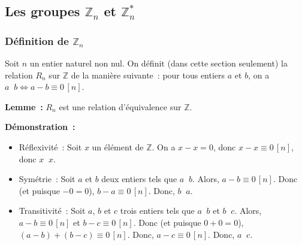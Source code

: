 \subsection{Les groupes \texorpdfstring{$\mathbb{Z}_n$}{Zn} et \texorpdfstring{$\mathbb{Z}_n^*$}{Zn*}}

\subsubsection{Définition de \texorpdfstring{$\mathbb{Z}_n$}{Zn}}
\label{sub:def_Z_nZ}

Soit $n$ un entier naturel non nul. 
On définit (dans cette section seulement) la relation $R_n$ sur $\mathbb{Z}$ de la manière suivante : pour tous entiers $a$ et $b$, on a $a \mathop{R_n} b \Leftrightarrow a - b \equiv 0 \, [n]$.

\medskip

\noindent\textbf{Lemme :} $R_n$ est une relation d'équivalence sur $\mathbb{Z}$. 

\medskip

\noindent\textbf{Démonstration :} 
\begin{itemize}[nosep]
    \item Réflexivité : Soit $x$ un élément de $\mathbb{Z}$. 
        On a $x - x = 0$, donc $x - x \equiv 0 \, [n]$, donc $x \mathop{R_n} x$.
    \item Symétrie : Soit $a$ et $b$ deux entiers tels que $a \mathop{R_n} b$.
        Alors, $a - b \equiv 0 \, [n]$.
        Donc (et puisque $-0 = 0$), $b - a \equiv 0 \, [n]$.
        Donc, $b \mathop{R_n} a$.
    \item Transitivité : Soit $a$, $b$ et $c$ trois entiers tels que $a \mathop{R_n} b$ et $b \mathop{R_n} c$.
        Alors, $a - b \equiv 0 \, [n]$ et $b - c \equiv 0 \, [n]$.
        Donc (et puisque $0 + 0 = 0$), $(a - b) + (b - c) \equiv 0 \, [n]$.
        Donc, $a - c \equiv 0 \, [n]$.
        Donc, $a \mathop{R_n} c$.
\end{itemize}

\done

\medskip

